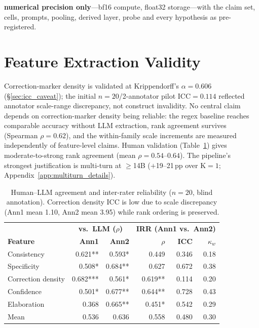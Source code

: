 \textbf{numerical precision only}---bf16 compute, float32 storage---with the claim set, cells, prompts, pooling, derived layer, probe and every hypothesis as pre-registered.

\section{Feature Extraction Validity}\label{app:feature_validity}

Correction-marker density is validated at Krippendorff's $\alpha=0.606$ (§\ref{sec:icc_caveat}); the initial $n=20$/2-annotator pilot ICC$=0.114$ reflected annotator scale-range discrepancy, not construct invalidity. No central claim depends on correction-marker density being reliable: the regex baseline reaches comparable accuracy without LLM extraction, rank agreement survives (Spearman $\rho=0.62$), and the within-family scale increments are measured independently of feature-level claims. Human validation (Table~\ref{tab:human_llm_agreement}) gives moderate-to-strong rank agreement (mean $\rho = 0.54$--$0.64$). The pipeline's strongest justification is multi-turn at $\geq$14B ($+$19--21\,pp over K$=1$; Appendix~\ref{app:multiturn_details}).

\begin{table}[h]
\centering
\caption{Human--LLM agreement and inter-rater reliability ($n=20$, blind annotation). Correction density ICC is low due to scale discrepancy (Ann1 mean 1.10, Ann2 mean 3.95) while rank ordering is preserved.}
\label{tab:human_llm_agreement}
\begin{tabular}{lrr|rrr}
\toprule
 & \multicolumn{2}{c|}{\textbf{vs.\ LLM ($\rho$)}} & \multicolumn{3}{c}{\textbf{IRR (Ann1 vs.\ Ann2)}} \\
\textbf{Feature} & \textbf{Ann1} & \textbf{Ann2} & \textbf{$\rho$} & \textbf{ICC} & \textbf{$\kappa_w$} \\
\midrule
Consistency   & 0.621** & 0.593*  & 0.449  & 0.346 & 0.18 \\
Specificity   & 0.508*  & 0.684** & 0.627  & 0.672 & 0.38 \\
Correction density & 0.682***& 0.561*  & 0.619**& 0.114 & 0.20 \\
Confidence    & 0.501*  & 0.677** & 0.644**& 0.728 & 0.43 \\
Elaboration   & 0.368   & 0.665** & 0.451* & 0.542 & 0.29 \\
\midrule
Mean          & 0.536   & 0.636   & 0.558  & 0.480 & 0.30 \\
\bottomrule
\end{tabular}
\end{table}

